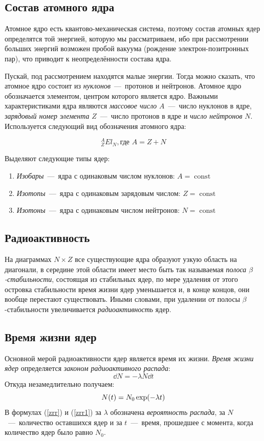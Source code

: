 \documentclass[12pt]{article}
\DeclareMathOperator\const{const}
\begin{document}
\subsection{Состав атомного ядра}
Атомное ядро есть квантово\--механическая система, поэтому состав атомных ядер определятся той энергией, которую мы рассматриваем, ибо при рассмотрении больших энергий возможен пробой вакуума (рождение электрон-позитронных пар), что приводит к неопределённости состава ядра.

\par
Пускай, под рассмотрением находятся малые энергии. Тогда можно сказать, что атомное ядро состоит из \emph{нуклонов}~\----~протонов и нейтронов. Атомное ядро обозначается элементом, центром которого является ядро. Важными характеристиками ядра являются \emph{массовое число} $A$~\----~число нуклонов в ядре, \emph{зарядовый номер элемента} $Z$~\----~число протонов в ядре и \emph{число нейтронов} $N$. Используется следующий вид обозначения атомного ядра:

\begin{equation}
 {}^{A}_{Z} El_N, \text{где } A = Z + N
\end{equation}

Выделяют следующие типы ядер:
\begin{enumerate}
 \item \emph{Изобары}~\----~ядра с одинаковым числом нуклонов:
 $
 A = \const
 $
 \item \emph{Изотопы}~\----~ядра с одинаковым зарядовым числом:
 $
 Z = \const
 $
 \item \emph{Изотоны}~\----~ядра с одинаковым числом нейтронов:
 $
 N = \const
 $
\end{enumerate}

\subsection{Радиоактивность}
На диаграммах $N \times Z$ все существующие ядра образуют узкую область на диагонали, в середине этой области имеет место быть так называемая \emph{полоса $\beta$\--стабильности}, состоящая из стабильных ядер, по мере удаления от этого островка стабильности время жизни ядер уменьшается и, в конце концов, они вообще перестают существовать. Иными словами, при удалении от полосы $\beta$\--стабильности увеличивается \emph{радиоактивность} ядер.

\subsection{Время жизни ядер}
Основной мерой радиоактивности ядер является время их жизни. \emph{Время жизни ядер} определяется \emph{законом радиоактивного распада}:
\begin{equation}\label{zrr}
 \dd N = -\lambda N \dd t
\end{equation}
Откуда незамедлительно получаем:
\begin{equation}\label{zrr1}
 N\qty(t) = N_0 \exp(-\lambda t)
\end{equation}
В формулах (\ref{zrr}) и (\ref{zrr1}) за $\lambda$ обозначена \emph{вероятность распада}, за $N$~\----~количество оставшихся ядер и за $t$~\----~время, прошедшее с момента, когда количество ядер было равно $N_0$.
\end{document}
